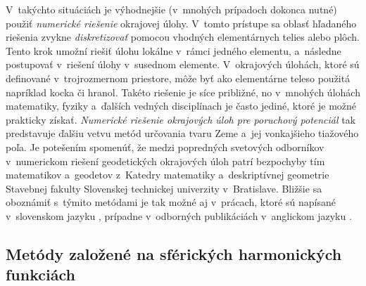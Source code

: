\documentclass[a4paper, 12pt]{book}
\begin{document}
V~takýchto situáciách je výhodnejšie (v~mnohých prípadoch dokonca nutné) použiť 
\emph{numerické riešenie} okrajovej úlohy.  V~tomto prístupe sa oblasť 
hľadaného riešenia zvykne \emph{diskretizovať} pomocou vhodných elementárnych 
telies alebo plôch.  Tento krok umožní riešiť úlohu lokálne v~rámci jedného 
elementu, a~následne postupovať v~riešení úlohy v~susednom elemente.  
V~okrajových úlohách, ktoré sú definované v~trojrozmernom priestore, môže byť 
ako elementárne teleso použitá napríklad kocka či hranol.  Takéto riešenie je 
síce približné, no v~mnohých úlohách matematiky, fyziky a~ďalších vedných 
disciplínach je často jediné, ktoré je možné prakticky získať.  \emph{Numerické 
riešenie okrajových úloh pre poruchový potenciál} tak predstavuje ďalšiu vetvu 
metód určovania tvaru Zeme a~jej vonkajšieho tiažového poľa.  Je potešením 
spomenúť, že medzi popredných svetových odborníkov v~numerickom riešení 
geodetických okrajových úloh patrí bezpochyby tím matematikov a~geodetov 
z~Katedry matematiky a~deskriptívnej geometrie Stavebnej fakulty Slovenskej 
technickej univerzity v~Bratislave.  Bližšie sa oboznámiť s~týmito metódami je 
tak možné aj v~prácach, ktoré sú napísané v~slovenskom jazyku 
\parencite[napríklad][]{Janak2006,Macak2021}, prípadne v~odborných publikáciách 
v~anglickom jazyku 
\parencite[napríklad][]{Cunderlik2008,Faskova2010,Macak2014}.


\subsection{Metódy založené na sférických harmonických funkciách}
\end{document}
